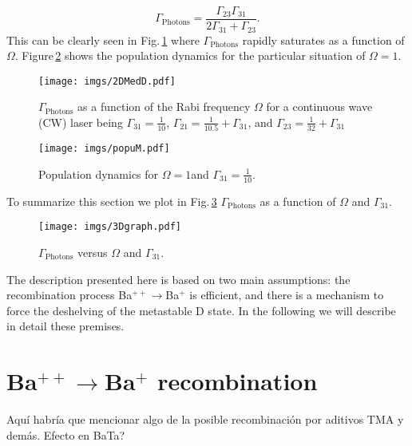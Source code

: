 \begin{equation}
\Gamma_{\text{Photons}}=\frac{\Gamma_{23}\Gamma_{31}}{2\Gamma_{31}+\Gamma_{23}}.
\end{equation}
This can be clearly seen in Fig.\,\ref{2DMedD} where $\Gamma_{\text{Photons}}$ rapidly saturates as a function of $\Omega$. Figure\,\ref{popuM} shows the population dynamics for the particular situation of $\Omega=1$\ns. 
\begin{figure}[ht!]
\begin{center}
\texttt{[image: imgs/2DMedD.pdf]}
\caption{\label{2DMedD} $\Gamma_{\text{Photons}}$ as a function of the Rabi frequency $\Omega$ for a continuous wave (CW) laser being $\Gamma_{31}=\frac{1}{10}$\ns, $\Gamma_{21}=\frac{1}{10.5}+\Gamma_{31}$\ns, and $\Gamma_{23}=\frac{1}{32}+\Gamma_{31}$\ns}
\end{center}
\end{figure}


\begin{figure}[ht!]
\begin{center}
\texttt{[image: imgs/popuM.pdf]}
\caption{\label{popuM} Population dynamics for $\Omega=1$\ns and  $\Gamma_{31}=\frac{1}{10}$\ns.}
\end{center}
\end{figure}
To summarize this section we plot in Fig.\,\ref{3Dgraph} $\Gamma_{\text{Photons}}$ as a function of $\Omega$ and $\Gamma_{31}$.
\begin{figure}[ht!]
\begin{center}
\texttt{[image: imgs/3Dgraph.pdf]}
\caption{\label{3Dgraph} $\Gamma_{\text{Photons}}$ versus $\Omega$ and $\Gamma_{31}$.}
\end{center}
\end{figure}

The description presented here is based on two main assumptions: the recombination process Ba$^{++}\rightarrow$Ba$^+$ is efficient, and there is a mechanism to force the deshelving of the metastable D state. In the following we will describe in detail these premises.

\section{Ba$^{++}\rightarrow$Ba$^+$ recombination}

Aquí habría que mencionar algo de la posible recombinación por aditivos TMA y demás. Efecto en BaTa?

